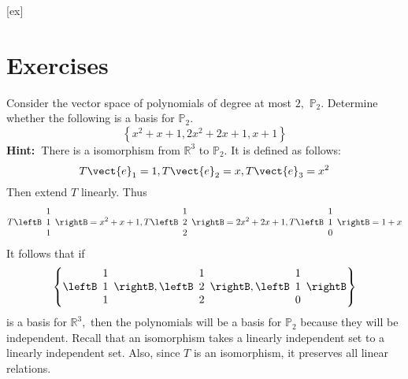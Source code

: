 [ex]
\section*{Exercises}

\begin{enumialphparenastyle}

\begin{ex} Consider the vector space of polynomials of degree at most $2,$ $%
\mathbb{P}_{2}$. Determine whether the following is a basis for $\mathbb{P}%
_{2}$.
\begin{equation*}
\left\{ x^{2}+x+1,2x^{2}+2x+1,x+1\right\}
\end{equation*}
\textbf{Hint:\ }There is a isomorphism from $\mathbb{R}^{3}$ to $\mathbb{P}
_{2}$. It is defined as follows:\ 
\begin{equation*}
T\vect{e}_{1}=1,T\vect{e}_{2}=x,T\vect{e}_{3}=x^{2}
\end{equation*}
Then extend $T$ linearly. Thus
\begin{equation*}
T\leftB 
\begin{array}{c}
1 \\ 
1 \\ 
1
\end{array}
\rightB =x^{2}+x+1,T\leftB 
\begin{array}{c}
1 \\ 
2 \\ 
2
\end{array}
\rightB =2x^{2}+2x+1,T\leftB 
\begin{array}{c}
1 \\ 
1 \\ 
0
\end{array}
\rightB =1+x
\end{equation*}
It follows that if 
\begin{equation*}
\left\{ \leftB 
\begin{array}{c}
1 \\ 
1 \\ 
1
\end{array}
\rightB ,\leftB 
\begin{array}{c}
1 \\ 
2 \\ 
2
\end{array}
\rightB ,\leftB 
\begin{array}{c}
1 \\ 
1 \\ 
0
\end{array}
\rightB \right\}
\end{equation*}
is a basis for $\mathbb{R}^{3},$ then the polynomials will be a basis for $
\mathbb{P}_{2}$ because they will be independent. Recall that an isomorphism
takes a linearly independent set to a linearly independent set. Also, since $
T$ is an isomorphism, it preserves all linear relations.
\end{ex}


\end{enumialphparenastyle}
